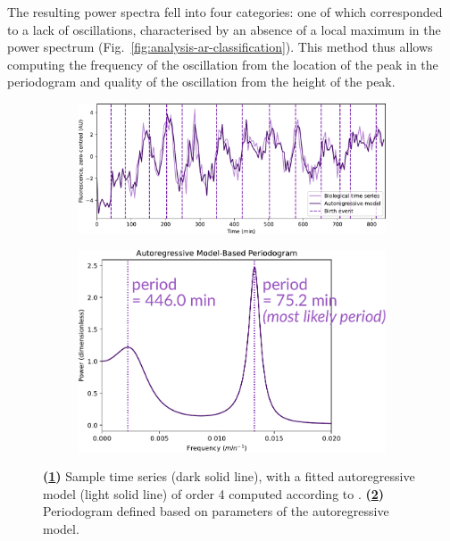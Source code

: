 The resulting power spectra fell into four categories: one of which corresponded to a lack of oscillations, characterised by an absence of a local maximum in the power spectrum (Fig.\ \ref{fig:analysis-ar-classification}).
This method thus allows computing the frequency of the oscillation from the location of the peak in the periodogram and quality of the oscillation from the height of the peak.

\begin{figure}
  \centering
  \begin{subfigure}[htpb]{0.6\textwidth}
   \centering
   \includegraphics[width=\textwidth]{timeseries_example_for_ar}
   \caption{
   }
   \label{fig:analysis-ar-timeseries}
  \end{subfigure}%
  \begin{subfigure}[htpb]{0.4\textwidth}
   \centering
   \includegraphics[width=\textwidth]{ar}
   \caption{
   }
   \label{fig:analysis-ar-periodogram}
  \end{subfigure}

  \caption{
    \textbf{(\ref{fig:analysis-ar-timeseries})}
    Sample time series (dark solid line), with a fitted autoregressive model (light solid line) of order 4 computed according to \textcite{jiaFrequencyDomainAnalysis2020}.
    \textbf{(\ref{fig:analysis-ar-periodogram})}
    Periodogram defined based on parameters of the autoregressive model.
  }
  \label{fig:analysis-ar}
\end{figure}

